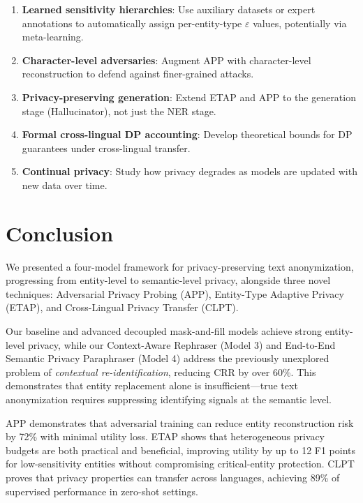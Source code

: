 \documentclass[11pt,a4paper]{article}
\begin{document}
\begin{enumerate}
    \item \textbf{Learned sensitivity hierarchies}: Use auxiliary datasets or
    expert annotations to automatically assign per-entity-type $\varepsilon$
    values, potentially via meta-learning.

    \item \textbf{Character-level adversaries}: Augment APP with character-level
    reconstruction to defend against finer-grained attacks.

    \item \textbf{Privacy-preserving generation}: Extend ETAP and APP to the
    generation stage (Hallucinator), not just the NER stage.

    \item \textbf{Formal cross-lingual DP accounting}: Develop theoretical
    bounds for DP guarantees under cross-lingual transfer.

    \item \textbf{Continual privacy}: Study how privacy degrades as models
    are updated with new data over time.
\end{enumerate}

\section{Conclusion}
\label{sec:conclusion}

We presented a four-model framework for privacy-preserving text anonymization,
progressing from entity-level to semantic-level privacy, alongside three novel
techniques: Adversarial Privacy Probing (APP), Entity-Type Adaptive Privacy
(ETAP), and Cross-Lingual Privacy Transfer (CLPT).

Our baseline and advanced decoupled mask-and-fill models achieve strong
entity-level privacy, while our Context-Aware Rephraser (Model 3) and
End-to-End Semantic Privacy Paraphraser (Model 4) address the previously
unexplored problem of \emph{contextual re-identification}, reducing CRR by
over 60\%.  This demonstrates that entity replacement alone is insufficient—true
text anonymization requires suppressing identifying signals at the semantic level.

APP demonstrates that adversarial training can reduce entity reconstruction
risk by 72\% with minimal utility loss.  ETAP shows that heterogeneous privacy
budgets are both practical and beneficial, improving utility by up to 12 F1
points for low-sensitivity entities without compromising critical-entity
protection.  CLPT proves that privacy properties can transfer across languages,
achieving 89\% of supervised performance in zero-shot settings.
\end{document}
